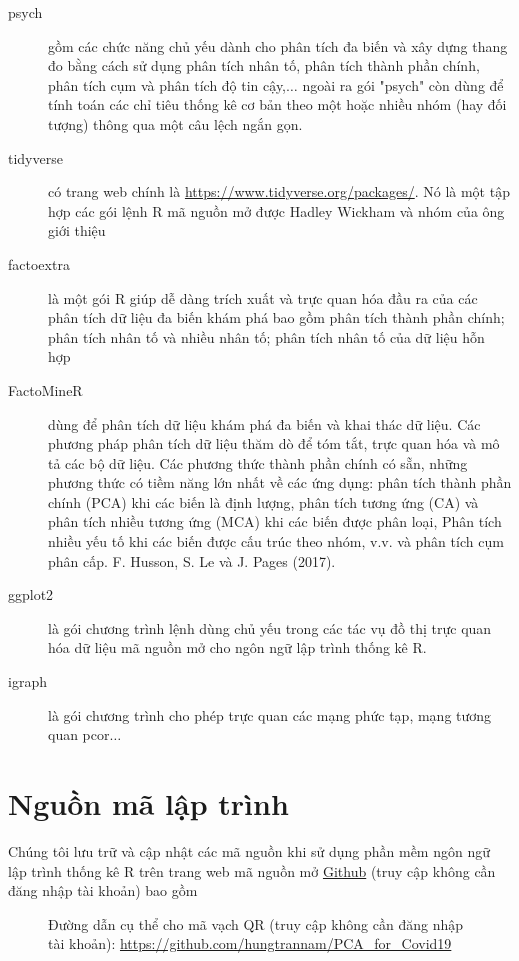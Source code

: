 \documentclass[../thesis.tex]{subfiles}
\begin{document}
\begin{description}
	\item[psych] gồm các chức năng chủ yếu dành cho phân tích đa biến và xây dựng thang đo bằng cách sử dụng phân tích nhân tố, phân tích thành phần chính, phân tích cụm và phân tích độ tin cậy,$ \ldots $ ngoài ra gói "psych" còn dùng để tính toán các chỉ tiêu thống kê cơ bản theo một hoặc nhiều nhóm (hay đối tượng) thông qua một câu lệch ngắn gọn.
	\item[tidyverse] có trang web chính là \url{https://www.tidyverse.org/packages/}. Nó là một tập hợp các gói lệnh R mã nguồn mở được Hadley Wickham và nhóm của ông giới thiệu
	\item[factoextra] là một gói R giúp dễ dàng trích xuất và trực quan hóa đầu ra của các phân tích dữ liệu đa biến khám phá bao gồm phân tích thành phần chính; phân tích nhân tố và nhiều nhân tố; phân tích nhân tố của dữ liệu hỗn hợp 
	\item[FactoMineR] dùng để phân tích dữ liệu khám phá đa biến và khai thác dữ liệu. Các phương pháp phân tích dữ liệu thăm dò để tóm tắt, trực quan hóa và mô tả các bộ dữ liệu. Các phương thức thành phần chính có sẵn, những phương thức có tiềm năng lớn nhất về các ứng dụng: phân tích thành phần chính (PCA) khi các biến là định lượng, phân tích tương ứng (CA) và phân tích nhiều tương ứng (MCA) khi các biến được phân loại, Phân tích nhiều yếu tố khi các biến được cấu trúc theo nhóm, v.v. và phân tích cụm phân cấp. F. Husson, S. Le và J. Pages (2017).
	\item[ggplot2] là gói chương trình lệnh dùng chủ yếu trong các tác vụ đồ thị trực quan hóa dữ liệu mã nguồn mở cho ngôn ngữ lập trình thống kê R.
	\item[igraph] là gói chương trình cho phép trực quan các mạng phức tạp, mạng tương quan pcor$\ldots$
\end{description}
	
	
	\section{Nguồn mã lập trình}
	
Chúng tôi lưu trữ và cập nhật các mã nguồn khi sử dụng phần mềm ngôn ngữ lập trình thống kê R trên trang web mã nguồn mở \href{https://github.com/hungtrannam/PCA_for_Covid19}{Github} (truy cập không cần đăng nhập tài khoản) bao gồm

\begin{SCfigure}
	\centering
	\caption[Đường dẫn cụ thể cho mã vạch QR]{Đường dẫn cụ thể cho mã vạch QR (truy cập không cần đăng nhập tài khoản): \url{https://github.com/hungtrannam/PCA_for_Covid19}}
\end{SCfigure}
	
\end{document}
